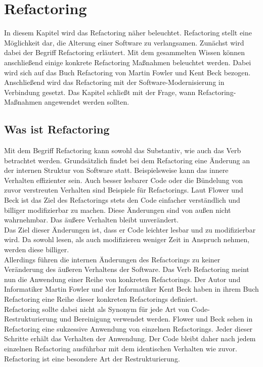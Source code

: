 \chapter{Refactoring}
\label{refactoring}
\label{chapter4}
In diesem Kapitel wird das Refactoring näher beleuchtet. Refactoring stellt eine Möglichkeit dar, die Alterung einer Software zu verlangsamen. Zunächst wird dabei der Begriff Refactoring erläutert. Mit dem gesammelten Wissen können anschließend einige konkrete Refactoring Maßnahmen beleuchtet werden. Dabei wird sich auf das Buch Refactoring \cite{fowler_refactoring_2018} von Martin Fowler und Kent Beck bezogen. Anschließend wird das Refactoring mit der Software-Modernisierung in Verbindung gesetzt. Das Kapitel schließt mit der Frage, wann Refactoring-Maßnahmen angewendet werden sollten.

\section{Was ist Refactoring}
Mit dem Begriff Refactoring kann sowohl das Substantiv, wie auch das Verb betrachtet werden. Grundsätzlich findet bei dem Refactoring eine Änderung an der internen Struktur von Software statt. Beispielsweise kann das innere Verhalten effizienter sein. Auch besser lesbarer Code oder die Bündelung von zuvor verstreuten Verhalten sind Beispiele für Refactorings. Laut Flower und Beck ist das Ziel des Refactorings stets den Code einfacher verständlich und billiger modifizierbar zu machen. Diese Änderungen sind von außen nicht wahrnehmbar. Das äußere Verhalten bleibt unverändert.  \\
Das Ziel dieser Änderungen ist, dass er Code leichter lesbar und zu modifizierbar wird. Da sowohl lesen, als auch modifizieren weniger Zeit in Anspruch nehmen, werden diese billiger.\\
Allerdings führen die internen Änderungen des Refactorings zu keiner Veränderung des äußeren Verhaltens der Software. 
Das Verb Refactoring meint nun die Anwendung einer Reihe von konkreten Refactorings. Der Autor und Informatiker Martin Fowler und der Informatiker Kent Beck haben in ihrem Buch Refactoring eine Reihe dieser konkreten Refactorings definiert. \cite{fowler_refactoring_2018}\\
\newline
Refactoring sollte dabei nicht als Synonym für jede Art von Code-Restrukturierung und Bereinigung verwendet werden. Flower und Beck sehen in Refactoring eine sukzessive Anwendung von einzelnen Refactorings.\cite{fowler_refactoring_2018} Jeder dieser Schritte erhält das Verhalten der Anwendung. Der Code bleibt daher nach jedem einzelnen Refactoring ausführbar mit dem identischen Verhalten wie zuvor. Refactoring ist eine besondere Art der Restrukturierung.\\

